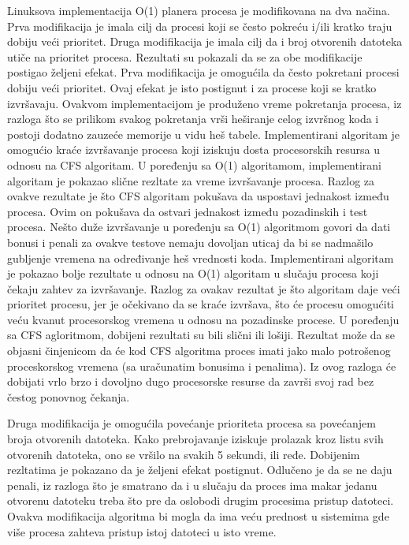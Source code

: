 Linuksova implementacija O(1) planera procesa je modifikovana na dva načina. Prva
modifikacija je imala cilj da procesi koji se često pokreću i/ili kratko traju dobiju veći
prioritet. Druga modifikacija je imala cilj da i broj otvorenih datoteka utiče na prioritet
procesa. Rezultati su pokazali da se za obe modifikacije postigao željeni efekat.
Prva modifikacija je omogućila da često pokretani procesi dobiju veći prioritet. Ovaj efekat je
isto postignut i za procese koji se kratko izvršavaju. Ovakvom implementacijom je produženo
vreme pokretanja procesa, iz razloga što se prilikom svakog pokretanja vrši heširanje celog
izvršnog koda i postoji dodatno zauzeće memorije u vidu heš tabele. Implementirani
algoritam je omogućio kraće izvršavanje procesa koji iziskuju dosta procesorskih resursa u
odnosu na CFS algoritam. U poređenju sa O(1) algoritamom, implementirani algoritam je
pokazao slične rezltate za vreme izvršavanje procesa. Razlog za ovakve rezultate je što CFS
algoritam pokušava da uspostavi jednakost između procesa. Ovim on pokušava da ostvari
jednakost između pozadinskih i test procesa. Nešto duže izvršavanje u poređenju sa O(1)
algoritmom govori da dati bonusi i penali za ovakve testove nemaju dovoljan uticaj da bi se
nadmašilo gubljenje vremena na određivanje heš vrednosti koda. Implementirani algoritam je
pokazao bolje rezultate u odnosu na O(1) algoritam u slučaju procesa koji čekaju zahtev za
izvršavanje. Razlog za ovakav rezultat je što algoritam daje veći prioritet procesu, jer je
očekivano da se kraće izvršava, što će procesu omogućiti veću kvanut procesorskog vremena
u odnosu na pozadinske procese. U poređenju sa CFS agloritmom, dobijeni rezultati su bili
slični ili lošiji. Rezultat može da se objasni činjenicom da će kod CFS algoritma proces imati
jako malo potrošenog proceskorskog vremena (sa uračunatim bonusima i penalima). Iz ovog
razloga će dobijati vrlo brzo i dovoljno dugo procesorske resurse da završi svoj rad bez
čestog ponovnog čekanja.

Druga modifikacija je omogućila povećanje prioriteta procesa sa povećanjem broja otvorenih
datoteka. Kako prebrojavanje iziskuje prolazak kroz listu svih otvorenih datoteka, ono se
vršilo na svakih 5 sekundi, ili ređe. Dobijenim rezltatima je pokazano da je željeni efekat
postignut. Odlučeno je da se ne daju penali, iz razloga što je smatrano da i u slučaju da proces
ima makar jedanu otvorenu datoteku treba što pre da oslobodi drugim procesima pristup
datoteci. Ovakva modifikacija algoritma bi mogla da ima veću prednost u sistemima gde više
procesa zahteva pristup istoj datoteci u isto vreme.

